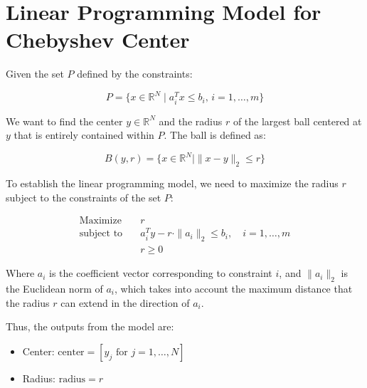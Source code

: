 \documentclass{article}
\begin{document}
\section*{Linear Programming Model for Chebyshev Center}

Given the set \( P \) defined by the constraints:

\[
P = \{ x \in \mathbb{R}^N \mid a_i^T x \leq b_i, \, i = 1, \ldots, m \}
\]

We want to find the center \( y \in \mathbb{R}^N \) and the radius \( r \) of the largest ball centered at \( y \) that is entirely contained within \( P \). The ball is defined as:

\[
B(y, r) = \{ x \in \mathbb{R}^N \mid \| x - y \|_2 \leq r \}
\]

To establish the linear programming model, we need to maximize the radius \( r \) subject to the constraints of the set \( P \):

\begin{align*}
\text{Maximize} \quad & r \\
\text{subject to} \quad & a_i^T y - r \cdot \| a_i \|_2 \leq b_i, \quad i = 1, \ldots, m \\
& r \geq 0
\end{align*}

Where \( a_i \) is the coefficient vector corresponding to constraint \( i \), and \( \| a_i \|_2 \) is the Euclidean norm of \( a_i \), which takes into account the maximum distance that the radius \( r \) can extend in the direction of \( a_i \).

Thus, the outputs from the model are:

\begin{itemize}
    \item Center: \( \text{center} = [y_j \text{ for } j = 1, \ldots, N] \)
    \item Radius: \( \text{radius} = r \)
\end{itemize}
\end{document}
